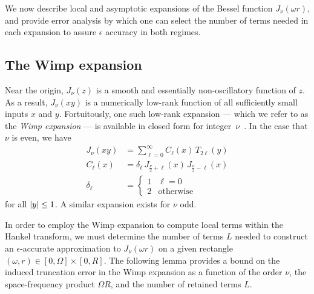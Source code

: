 We now describe local and asymptotic expansions of the Bessel function
$J_\nu(\omega r)$, and provide error analysis by which one can select the number
of terms needed in each expansion to assure $\epsilon$ accuracy in both regimes.

\subsection{The Wimp expansion}\label{sec:local}

Near the origin, $J_\nu(z)$ is a smooth and essentially non-oscillatory function
of $z$. As a result, $J_\nu(xy)$ is a numerically low-rank function of all
sufficiently small inputs $x$ and $y$. Fortuitously, one such low-rank expansion
--- which we refer to as the \textit{Wimp expansion} --- is available in closed
form for integer~$\nu$~\cite{wimp1962polynomial}. In the case that $\nu$ is
even, we have
\begin{equation}
    \begin{aligned}
        J_\nu(xy) 
        &= \sum_{\ell=0}^\infty C_\ell(x) \, T_{2\ell}(y) \\
        C_\ell(x) 
        &= \delta_\ell \, J_{\frac{\nu}{2} + \ell}(x) \, J_{\frac{\nu}{2} - \ell}(x) \\
        \delta_\ell 
        &= \begin{cases}
            1 & \ell=0 \\
            2 & \text{otherwise}
        \end{cases}
    \end{aligned}
\end{equation}
for all $\left|y\right| \leq 1$. A similar expansion exists for $\nu$ odd.

In order to employ the Wimp expansion to compute local terms within the Hankel
transform, we must determine the number of terms $L$ needed to construct an
$\epsilon$-accurate approximation to $J_\nu(\omega r)$ on a given rectangle
$(\omega, r) \in [0, \Omega] \times [0, R]$. The following lemma provides a
bound on the induced truncation error in the Wimp expansion as a function of the
order $\nu$, the space-frequency product $\Omega R$, and the number of retained
terms $L$.

